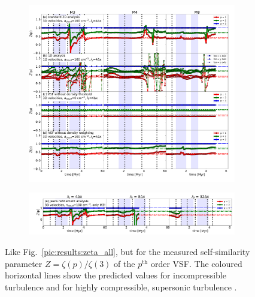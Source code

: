 \begin{figure}[!htb]
	\centering  
  
  \begin{subfigure}[c]{\textwidth}
      \includegraphics[width=\textwidth]{z_all_nojeans.pdf}
      \label{pic:results:z_all_nojeans}
  \end{subfigure}
  
  \begin{subfigure}[c]{\textwidth}
      \addtocounter{subfigure}{4}
      \includegraphics[width=\textwidth]{z_jeans.pdf}
      \label{pic:results:z_all_jeans}
  \end{subfigure}
  
  \caption{Like Fig.~\ref{pic:results:zeta_all}, but for the measured self-similarity parameter $Z = \zeta(p) / \zeta(3)$ of the $p^\mathrm{th}$ order VSF. The coloured horizontal lines show the predicted values for
   incompressible turbulence \citep[dash-dotted lines][]{She1994} 
and 
   for highly compressible, supersonic turbulence \citep[dashed lines;][]{Boldyrev2002}.}
	\label{pic:results:z_all}
\end{figure}

